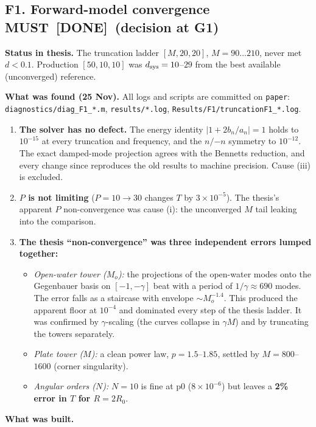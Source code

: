 \documentclass[10pt,a4paper]{article}
\newcommand{\MUST}{\textcolor{must}{\textbf{MUST}}}
\newcommand{\DONE}{\textcolor{done}{\textbf{[DONE]}}}
\begin{document}
\subsection*{F1. Forward-model convergence \MUST\ \quad \DONE\ (decision at G1)}
\textbf{Status in thesis.} The truncation ladder $[M,20,20]$, $M=90\ldots210$, never met $d<0.1$. Production $[50,10,10]$ was $d_{\rm sys}=10$--$29$ from the best available (unconverged) reference.

\textbf{What was found (25 Nov).} All logs and scripts are committed on \texttt{paper}: \texttt{diagnostics/diag\_F1\_*.m}, \texttt{results/*.log}, \texttt{Results/F1/truncationF1\_*.log}.
\begin{enumerate}[label=(\alph*)]
\item \textbf{The solver has no defect.} The energy identity $|1+2b_n/a_n|=1$ holds to $10^{-15}$ at every truncation and frequency, and the $n/{-n}$ symmetry to $10^{-12}$. The exact damped-mode projection agrees with the Bennetts reduction, and every change since reproduces the old results to machine precision. Cause (iii) is excluded.
\item \textbf{$P$ is not limiting} ($P=10\to30$ changes $T$ by $3\times10^{-5}$). The thesis's apparent $P$ non-convergence was cause (i): the unconverged $M$ tail leaking into the comparison.
\item \textbf{The thesis ``non-convergence'' was three independent errors lumped together:}
  \begin{itemize}
  \item \emph{Open-water tower ($M_o$):} the projections of the open-water modes onto the Gegenbauer basis on $[-1,-\gamma]$ beat with a period of $1/\gamma\approx690$ modes. The error falls as a staircase with envelope $\sim M_o^{-1.4}$. This produced the apparent floor at $10^{-4}$ and dominated every step of the thesis ladder. It was confirmed by $\gamma$-scaling (the curves collapse in $\gamma M$) and by truncating the towers separately.
  \item \emph{Plate tower ($M$):} a clean power law, $p=1.5$--$1.85$, settled by $M=800$--$1600$ (corner singularity).
  \item \emph{Angular orders ($N$):} $N=10$ is fine at p0 ($8\times10^{-6}$) but leaves a \textbf{2\% error in $T$ for $R=2R_0$}.
  \end{itemize}
\end{enumerate}
\textbf{What was built.}
\end{document}
